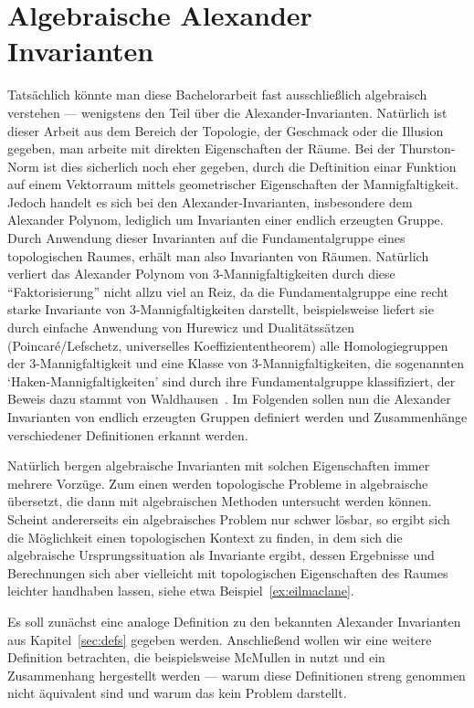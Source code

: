 
\section{Algebraische Alexander Invarianten}
\label{sec:algebra}
Tatsächlich könnte man diese Bachelorarbeit fast ausschließlich algebraisch verstehen --- wenigstens den Teil über die Alexander-Invarianten. Natürlich ist dieser Arbeit aus dem Bereich der Topologie, der Geschmack oder die Illusion gegeben, man arbeite mit direkten Eigenschaften der Räume. Bei der Thurston-Norm ist dies sicherlich noch eher gegeben, durch die Deftinition einar Funktion auf einem Vektorraum mittels geometrischer Eigenschaften der Mannigfaltigkeit. Jedoch handelt es sich bei den Alexander-Invarianten, insbesondere dem Alexander Polynom, lediglich um Invarianten einer endlich erzeugten Gruppe. Durch Anwendung dieser Invarianten auf die Fundamentalgruppe eines topologischen Raumes, erhält man also Invarianten von Räumen. Natürlich verliert das Alexander Polynom von 3-Mannigfaltigkeiten durch diese "`Faktorisierung"' nicht allzu viel an Reiz, da die Fundamentalgruppe eine recht starke Invariante von 3-Mannigfaltigkeiten darstellt, beispielsweise liefert sie durch einfache Anwendung von Hurewicz und Dualitätssätzen (Poincaré/Lefschetz, universelles Koeffiziententheorem) alle Homologiegruppen der 3-Mannigfaltigkeit und eine Klasse von 3-Mannigfaltigkeiten, die sogenannten `Haken-Mannigfaltigkeiten' sind durch ihre Fundamentalgruppe klassifiziert, der Beweis dazu stammt von Waldhausen~\cite{Waldhausen.1968}. Im Folgenden sollen nun die Alexander Invarianten von endlich erzeugten Gruppen definiert werden und Zusammenhänge verschiedener Definitionen erkannt werden.

Natürlich bergen algebraische Invarianten mit solchen Eigenschaften immer mehrere Vorzüge. Zum einen werden topologische Probleme in algebraische übersetzt, die dann mit algebraischen Methoden untersucht werden können. Scheint andererseits ein algebraisches Problem nur schwer lösbar, so ergibt sich die Möglichkeit einen topologischen Kontext zu finden, in dem sich die algebraische Ursprungssituation als Invariante ergibt, dessen Ergebnisse und Berechnungen sich aber vielleicht mit topologischen Eigenschaften des Raumes leichter handhaben lassen, siehe etwa Beispiel~\ref{ex:eilmaclane}.

Es soll zunächst eine analoge Definition zu den bekannten Alexander Invarianten aus Kapitel~\ref{sec:defs} gegeben werden. Anschließend wollen wir eine weitere Definition betrachten, die beispielsweise McMullen in \cite{MCMULLEN.2002} nutzt und ein Zusammenhang hergestellt werden --- warum diese Definitionen streng genommen nicht äquivalent sind und warum das kein Problem darstellt.

